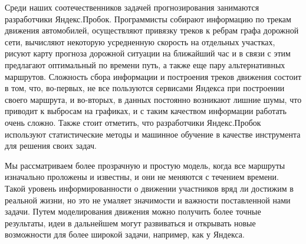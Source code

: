 \documentclass[12pt, a4paper]{article}
\begin{document}
	Среди наших соотечественников задачей прогнозирования занимаются разработчики Яндекс.Пробок. Программисты собирают информацию по трекам движения автомобилей, осуществляют привязку треков к ребрам графа дорожной сети, вычисляют некоторую усредненную скорость на отдельных участках, рисуют карту прогноза дорожной ситуации на ближайший час и в связи с этим предлагают оптимальный по времени путь, а также еще пару альтернативных маршрутов. Сложность сбора информации и построения треков движения состоит в том, что, во-первых, не все пользуются сервисами Яндекса при построении своего маршрута, и во-вторых, в данных постоянно возникают лишние шумы, что приводит к выбросам на графиках, и с таким качеством информации работать очень сложно. Также стоит отметить, что разработчики Яндекс.Пробок используют статистические методы и машинное обучение в качестве инструмента для решения своих задач.
	
	Мы рассматриваем более прозрачную и простую модель, когда все маршруты изначально проложены и известны, и они не меняются с течением времени. Такой уровень информированности о движении участников вряд ли достижим в реальной жизни, но это не умаляет значимости и важности поставленной нами задачи. Путем моделирования движения можно получить более точные результаты, идеи в дальнейшем могут развиваться и открывать новые возможности для более широкой задачи, например, как у Яндекса. 
	
\end{document}
